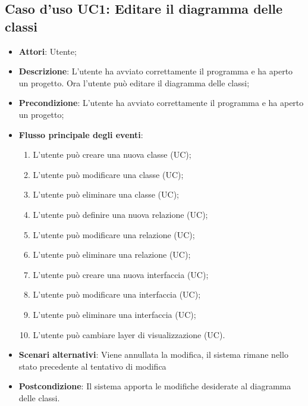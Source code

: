 \documentclass[../AnalisiDeiRequisiti.tex]{subfiles}
\begin{document}
	\subsection{Caso d'uso UC1: Editare il diagramma delle classi}
	\begin{itemize}
		\item \textbf{Attori}: Utente;
		
		\item \textbf{Descrizione}: L'utente ha avviato correttamente il programma e ha aperto un progetto. Ora l'utente può editare il diagramma delle classi;
		
		\item \textbf{Precondizione}: L'utente ha avviato correttamente il programma e ha aperto un progetto;
		\item \textbf{Flusso principale degli eventi}:
		\begin{enumerate}
			\item L'utente può creare una nuova classe (UC);
			\item L'utente può modificare una classe (UC);
			\item L'utente può eliminare una classe (UC);
			\item L'utente può definire una nuova relazione (UC);
			\item L'utente può modificare una relazione (UC);
			\item L'utente può eliminare una relazione (UC);
			\item L'utente può creare una nuova interfaccia (UC);
			\item L'utente può modificare una interfaccia (UC);
			\item L'utente può eliminare una interfaccia (UC);
			\item L'utente può cambiare layer di visualizzazione (UC).
		\end{enumerate}
		
		\item \textbf{Scenari alternativi}: Viene annullata la modifica, il sistema
		rimane nello stato precedente al tentativo di modifica
		
		\item \textbf{Postcondizione}: Il sistema apporta le modifiche desiderate al diagramma delle classi.
	\end{itemize}
	
\end{document}
